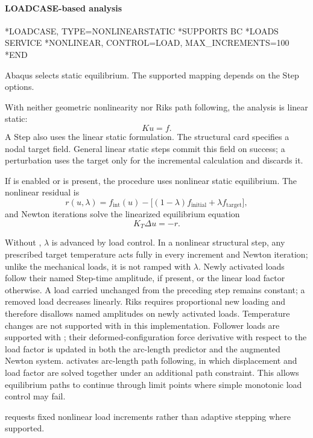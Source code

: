 \paragraph*{LOADCASE-based analysis}
\begin{inputdeck}
*LOADCASE, TYPE=NONLINEARSTATIC
*SUPPORTS
BC
*LOADS
SERVICE
*NONLINEAR, CONTROL=LOAD,
 MAX_INCREMENTS=100
*END
\end{inputdeck}


Abaqus  selects static equilibrium. The supported mapping depends on the Step options.

With neither geometric nonlinearity nor Riks path following, the analysis is linear static:
\[
Ku=f.
\]
A  Step also uses the linear static formulation.
The structural  card specifies a nodal target field.
General linear static steps commit this field on success; a perturbation
uses the target only for the incremental calculation and discards it.

If  is enabled or  is present, the procedure uses nonlinear static equilibrium. The nonlinear residual is
\[
r(u,\lambda)=f_\mathrm{int}(u)-\bigl[(1-\lambda)f_\mathrm{initial}+\lambda f_\mathrm{target}\bigr],
\]
and Newton iterations solve the linearized equilibrium equation
\[
K_T\Delta u=-r.
\]

Without , \(\lambda\) is advanced by load control. In a nonlinear
structural step, any prescribed target temperature acts fully in every
increment and Newton iteration; unlike the mechanical loads, it is not
ramped with \(\lambda\). Newly activated loads follow their named Step-time
amplitude, if present, or the linear load factor otherwise. A load carried
unchanged from the preceding step remains constant; a removed load decreases
linearly. Riks requires proportional new loading and therefore disallows named
amplitudes on newly activated loads. Temperature changes are not supported with
 in this implementation. Follower loads are supported with ;
their deformed-configuration force derivative with respect to the load factor is
updated in both the arc-length predictor and the augmented Newton system.
 activates arc-length path following, in which displacement and load
factor are solved together under an additional path constraint. This allows
equilibrium paths to continue through limit points where simple monotonic load
control may fail.

 requests fixed nonlinear load increments rather than adaptive stepping where supported.

